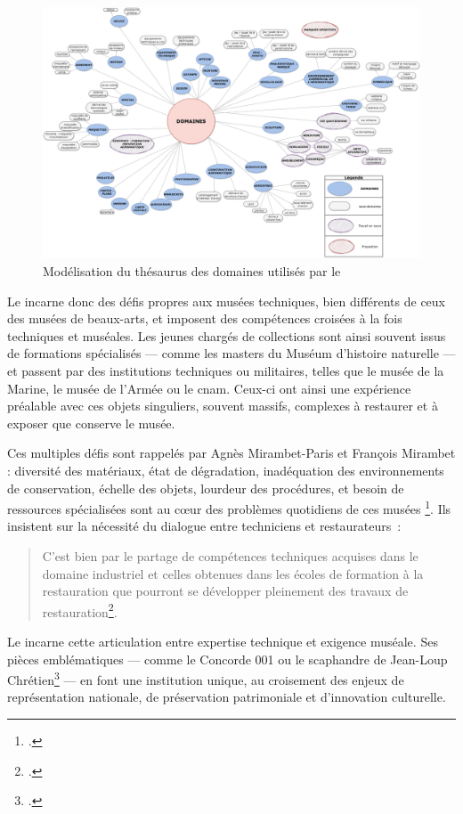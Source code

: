 \begin{figure}[htbp]
	\centering
	\includegraphics[width=\linewidth]{img/MODEL_domaines.png}
	\caption{Modélisation du thésaurus des domaines utilisés par le \mae}
	\label{fig:model_domaines}
\end{figure}

Le \mae incarne donc des défis propres aux musées techniques, bien différents de ceux des musées de beaux-arts, et imposent des compétences croisées à la fois techniques et muséales. Les jeunes chargés de collections sont ainsi souvent issus de formations spécialisés — comme les masters du Muséum d’histoire naturelle — et passent par des institutions techniques ou militaires, telles que le musée de la Marine, le musée de l’Armée ou le \ac{cnam}. Ceux-ci ont ainsi une expérience préalable avec ces objets singuliers, souvent massifs, complexes à restaurer et à exposer que conserve le musée.

Ces multiples défis sont rappelés par Agnès Mirambet-Paris et François Mirambet : diversité des matériaux, état de dégradation, inadéquation des environnements de conservation, échelle des objets, lourdeur des procédures, et besoin de ressources spécialisées sont au cœur des problèmes quotidiens de ces musées \footcite{mirambet-parisConservationrestaurationPatrimoineTechnique2011}. Ils insistent sur la nécessité du dialogue entre techniciens et restaurateurs :
\begin{quote}
	\og C’est bien par le partage de compétences techniques acquises dans le domaine industriel et celles obtenues dans les écoles de formation à la restauration que pourront se développer pleinement des travaux de restauration\footcite{mirambet-parisConservationrestaurationPatrimoineTechnique2011}.\fg
\end{quote}

Le \mae incarne cette articulation entre expertise technique et exigence muséale. Ses pièces emblématiques — comme le Concorde 001 ou le scaphandre de Jean-Loup Chrétien\footcite{champenoisTresorsMuseeLair2013} — en font une institution unique, au croisement des enjeux de représentation nationale, de préservation patrimoniale et d’innovation culturelle.
